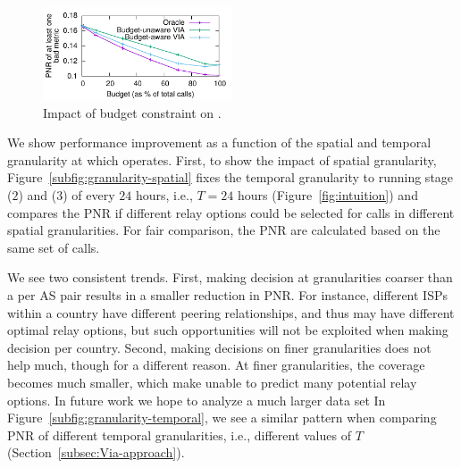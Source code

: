 \begin{figure}[t!]
\centering
\includegraphics[width=0.5\textwidth]{figures/Via-Eval-Budget-Overall-MinChoices-5-sRTT.pdf}
\caption{Impact of budget constraint on \hybrid.}
\label{fig:eval-budget}
\end{figure}





We show performance improvement as a function of the spatial and temporal granularity at which \hybrid operates. 
First, to show the impact of spatial granularity, Figure~\ref{subfig:granularity-spatial} fixes the temporal granularity to running stage ($2$) and ($3$) of \hybrid every $24$ hours, i.e., $T=24$ hours (Figure~\ref{fig:intuition}) 
 and compares the PNR if {different} relay options {could be} selected for calls in different spatial granularities. For fair comparison, the PNR are calculated based on the same set of calls.

We see two consistent trends. First, making decision at granularities coarser than a per AS pair results in a smaller reduction in PNR. For instance, different ISPs within a country have different peering relationships, and thus may have different optimal relay options, but such opportunities will not be exploited when making decision per country. Second, making decisions on finer granularities does not help much, though for a different reason. At finer granularities, the coverage becomes much smaller, which make \hybrid unable to predict many potential relay options.
In future work we hope to analyze a much larger data set
In Figure~\ref{subfig:granularity-temporal}, we see a similar pattern when comparing PNR of different temporal granularities, i.e., different values of $T$ (Section~\ref{subsec:Via-approach}).  

